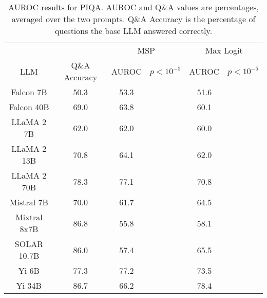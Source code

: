 \begin{table*}
\centering
\begin{tabular}{c|c|c|c|c|c}
& & \multicolumn{2}{c|}{MSP} & \multicolumn{2}{c}{Max Logit} \\ 
LLM & Q\&A Accuracy & AUROC & $p < 10^{-5}$ & AUROC & $p < 10^{-5}$\\ \hline
Falcon 7B & 50.3 & 53.3 &  & 51.6 & \\
Falcon 40B & 69.0 & 63.8 &  & 60.1 & \\
LLaMA 2 7B & 62.0 & 62.0 &  & 60.0 & \\
LLaMA 2 13B & 70.8 & 64.1 &  & 62.0 & \\
LLaMA 2 70B & 78.3 & 77.1 &  & 70.8 & \\
Mistral 7B & 70.0 & 61.7 &  & 64.5 & \\
Mixtral 8x7B & 86.8 & 55.8 &  & 58.1 & \\
SOLAR 10.7B & 86.0 & 57.4 &  & 65.5 & \\
Yi 6B & 77.3 & 77.2 &  & 73.5 & \\
Yi 34B & 86.7 & 66.2 &  & 78.4 & \\
\hline
\end{tabular}
\caption{AUROC results for PIQA. AUROC and Q\&A values are percentages, averaged over the two prompts. Q\&A Accuracy is the percentage of questions the base LLM answered correctly.}
\label{tab:piqa_auroc}
\end{table*}

